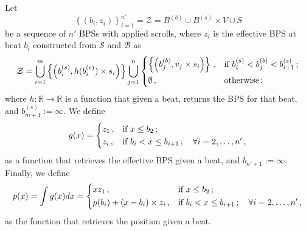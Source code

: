 \documentclass[a4paper,9pt]{article}
\begin{document}
 Let  
    \begin{equation}
	    \left\{ \left( b_{i},z_{i} \right) \right\} _{i=1}^{n'} = \mathcal{Z} = B^{(b)} \cup B^{(s)}\times V \cup S
	    \label{eq:Z}
    \end{equation}
    be a sequence of $n'$ BPSs with applied scrolls, where $z_i$ is the effective BPS at beat $b_i$
    constructed from $\mathcal{S}$ and $\mathcal{B}$ as 
    \begin{equation}
	    \mathcal{Z} = \bigcup_{i=1}^{m} \left\{\left( b_i^{(s)},h(b_i^{(s)})\times s_i \right)\right\}\bigcup_{j=1}^{n} 
	    \begin{dcases}
		    \left\{ \left( b_j^{(b)}, v_j\times s_i \right)\right\}\,, & \text{if $b_i^{(s)} < b_j^{(b)} < b_{i+1}^{(s)}$}\,; \\
		    \emptyset\,, & \text{otherwise}\,;
	    \end{dcases}
	    \label{eq:Z-construction}
    \end{equation}
    where $h: \mathbb{R} \rightarrow \mathbb{R}$ is a function that given a beat, returns the BPS for that beat, and $b_{m+1}^{(s)} := \infty$.
    We define
    \begin{equation}
	    g(x) = \begin{dcases}
		    z_1\,, & \text{if $ x \leq b_2 $}\,;\\
		    z_i\,, & \text{if $ b_{i} < x \leq b_{i+1}\,; \quad \forall i=2,\dots,n'$}\,,
	    \end{dcases}
	    \label{eq:final-g}
    \end{equation}
    as a function that retrieves the effective BPS given a beat, and $ b_{n'+1}:= \infty $. Finally, we define 
    \begin{equation}
	    p(x) = \int g(x) dx = \begin{dcases}
		    xz_1\,, & \text{if $ x \leq b_2 $}\,;\\
		    p(b_i) + (x-b_i)\times z_i\,, & \text{if $ b_{i} < x \leq b_{i+1}\,; \quad \forall i=2,\dots,n'$}\,,
	    \end{dcases}
	    \label{eq:position-final}
    \end{equation}
    as the function that retrieves the position given a beat.
\end{document}
